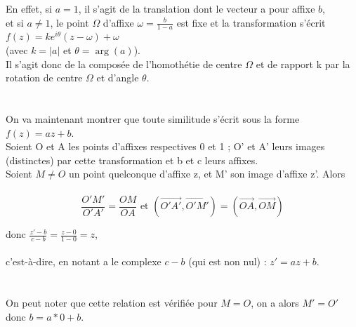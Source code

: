 \documentclass[a4paper,10pt]{book}
\begin{document}
En effet, si $a=1$, il s'agit de la translation dont le vecteur a pour affixe $b$,\\
et si $a\neq 1$, le point $\Omega$ d'affixe $\omega =\frac{b}{1-a}$ est fixe et la transformation s'écrit $f(z)=ke^{i\theta }(z-\omega )+\omega$\\
(avec $k=|a|$ et $\theta =\arg(a)$).\\

Il s'agit donc de la composée de l'homothétie de centre $\Omega$ et de rapport k par la rotation de centre $\Omega$ et d'angle $\theta$.\\\\\\

On va maintenant montrer que toute similitude s'écrit sous la forme $f(z)=az+b$.\\

Soient O et A les points d'affixes respectives 0 et 1 ; O' et A' leurs images (distinctes) par cette transformation et b et c leurs affixes.\\

Soient $M\neq O$ un point quelconque d'affixe z, et M' son image d'affixe z'. Alors\\\\
\[ \frac{O'M'}{O'A'}=\frac {OM}{OA} \text{ et } (\overrightarrow {O'A'},\overrightarrow {O'M'})=(\overrightarrow {OA},{\overrightarrow {OM}}) \]

donc $\frac {z'-b}{c-b}=\frac {z-0}{1-0}=z$,\\\\
c'est-à-dire, en notant a le complexe $c-b$ (qui est non nul) : $z'=az+b$.\\\\\\

On peut noter que cette relation est vérifiée pour $M=O$, on a alors $M'=O'$ donc $b=a*0+b$.

\newpage
\end{document}
